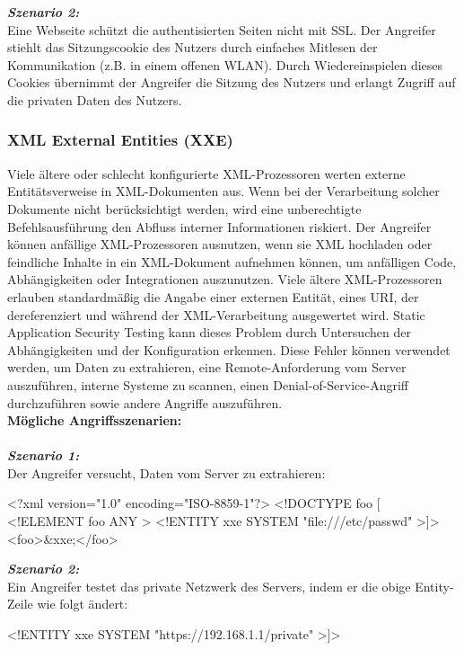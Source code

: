 \textbf{\textit{Szenario 2:}}\\
Eine Webseite schützt die authentisierten Seiten
nicht mit SSL. Der Angreifer stiehlt das Sitzungscookie des
Nutzers durch einfaches Mitlesen der Kommunikation (z.B. in
einem offenen WLAN). Durch Wiedereinspielen dieses
Cookies übernimmt der Angreifer die Sitzung des Nutzers und
erlangt Zugriff auf die privaten Daten des Nutzers\cite[9]{owasp17top10}.\\

\subsubsection{XML External Entities (XXE)}

Viele ältere oder schlecht konfigurierte XML-Prozessoren werten externe Entitätsverweise in XML-Dokumenten aus. Wenn bei der Verarbeitung solcher Dokumente nicht berücksichtigt werden, wird eine unberechtigte Befehlsausführung den Abfluss interner Informationen riskiert\cite[6]{owasp17top10}. Der Angreifer können anfällige XML-Prozessoren ausnutzen, wenn sie XML hochladen oder feindliche Inhalte in ein XML-Dokument aufnehmen können, um anfälligen Code, Abhängigkeiten oder Integrationen auszunutzen. Viele ältere XML-Prozessoren erlauben standardmäßig die Angabe einer externen Entität, eines URI, der dereferenziert und während der XML-Verarbeitung ausgewertet wird. Static Application Security Testing kann dieses Problem durch Untersuchen der Abhängigkeiten und der Konfiguration erkennen. Diese Fehler können verwendet werden, um Daten zu extrahieren, eine Remote-Anforderung vom Server auszuführen, interne Systeme zu scannen, einen Denial-of-Service-Angriff durchzuführen sowie andere Angriffe auszuführen\cite[10]{owasp17top10}.\\

\textbf{Mögliche Angriffsszenarien:}\\
\\
\textbf{\textit{Szenario 1:}}\\
Der Angreifer versucht, Daten vom Server zu extrahieren\cite[10]{owasp17top10}:

\begin{LaTeXCode}[caption={XML-Beispiel},captionpos=b, label=LaTeXCode:xxe1][numbers=none]
<?xml version="1.0" encoding="ISO-8859-1"?>
<!DOCTYPE foo [
<!ELEMENT foo ANY >
<!ENTITY xxe SYSTEM "file:///etc/passwd" >]>
<foo>\&xxe;</foo>
\end{LaTeXCode}

\textbf{\textit{Szenario 2:}}\\
Ein Angreifer testet das private Netzwerk des Servers, indem er die obige Entity-Zeile wie folgt ändert\cite[10]{owasp17top10}:
\\
\begin{LaTeXCode}[caption={XML-Beispiel 2},captionpos=b, label=LaTeXCode:xxe2][numbers=none]
<!ENTITY xxe SYSTEM "https://192.168.1.1/private" >]>
\end{LaTeXCode}

